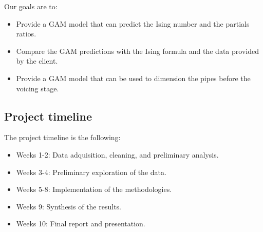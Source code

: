 \documentclass{psu-plan}
\begin{document}
Our goals are to:
\begin{itemize}
    \item Provide a GAM model that can predict the Ising number and the
        partials ratios.
    \item Compare the GAM predictions with the Ising formula and the data
        provided by the client.
    \item Provide a GAM model that can be used to dimension the pipes before
        the voicing stage.
\end{itemize}

\subsection{Project timeline}

The project timeline is the following:
\begin{itemize}
    \item Weeks 1-2: Data adquisition, cleaning, and preliminary analysis.
    \item Weeks 3-4: Preliminary exploration of the data.
    \item Weeks 5-8: Implementation of the methodologies.
    \item Weeks 9: Synthesis of the results.
    \item Weeks 10: Final report and presentation.
\end{itemize}

\nocite{*} %
\printbibliography[heading=bibintoc,title=Bibliography]
\end{document}
